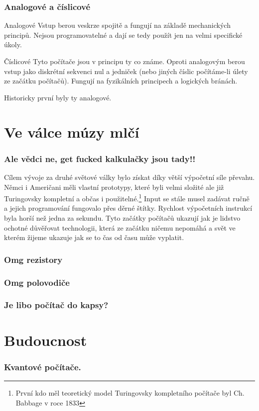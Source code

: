 \documentclass{beamer}
\begin{document}
\begin{frame}
 \frametitle{Analogové a číslicové}
 \begin{block}{Analogové}
  Vstup berou veskrze spojitě a fungují na základě mechanických principů. Nejsou
  programovatelné a dají se tedy použít jen na velmi specifické úkoly.
 \end{block}

 \begin{block}{Číslicové}
  Tyto počítače jsou v principu ty co známe. Oproti analogovým berou vstup jako
  diskrétní sekvenci nul a jedniček (nebo jiných číslic počítáme-li úlety ze
  začátku počítačů). Fungují na fyzikálních principech a logických bránách.
  
 \end{block}

Historicky první byly ty analogové.
 \end{frame}



\section{Ve válce múzy mlčí}
\begin{frame}
 \frametitle{Ale vědci ne, get fucked kalkulačky jsou tady!!}
Cílem vývoje za druhé světové války bylo získat díky větší výpočetní síle
převahu. Němci i Američani měli vlastní prototypy, které byli velmi složité ale
již Turingovsky kompletní a občas i použitelné.\footnote{První kdo měl
teoretický model Turingovsky kompletního počítače byl Ch. Babbage v roce 1833}
\vfill
Input se stále musel zadávat ručně a jejich programování fungovalo přes děrné
štítky. Rychlost výpočetních instrukcí byla horší než jedna za sekundu.
\vfill
Tyto začátky počítačů ukazují jak je lidstvo ochotné důvěřovat technologii,
která ze začátku ničemu nepomáhá a svět ve kterém žijeme ukazuje jak se to čas
od času může vyplatit.
\end{frame}

\begin{frame}
 \frametitle{Omg rezistory}
\end{frame}
\begin{frame}
 \frametitle{Omg polovodiče}
\end{frame}
\begin{frame}
 \frametitle{Je libo počítač do kapsy?}
\end{frame}

\section{Budoucnost}
\begin{frame}
 \frametitle{Kvantové počítače.}
\end{frame}
\end{document}
